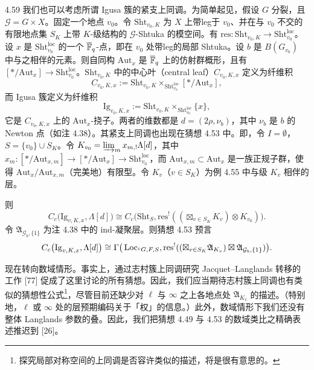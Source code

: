 \begin{exam}{4.59}\label{thm:a2-4-59}
我们也可以考虑所谓 Igusa 簇的紧支上同调。为简单起见，假设 $G$ 分裂，且 $\mathcal G=G\times X$。固定一个地点 $v_0$。令 $\mathrm{Sht}_{v_0,K}$ 为 $X$ 上带leg于 $v_0$、并在与 $v_0$ 不交的有限地点集 $S_K$ 上带 $K$-级结构的 $\mathcal G$-Shtuka 的模空间。有 $\mathrm{res}:\mathrm{Sht}_{v_0,K}\to\mathrm{Sht}^{\mathrm{loc}}_{v_0}$。设 $x$ 是 $\mathrm{Sht}^{\mathrm{loc}}_{v_0}$ 的一个 $\overline{\mathbb{F}}_q$-点，即在 $v_0$ 处带leg的局部 Shtuka。设 $b$ 是 $B(G_{v_0})$ 中与之相伴的元素。则自同构 $\mathrm{Aut}_x$ 是 $\overline{\mathbb{F}}_q$ 上的仿射群概形，且有 $[*/\mathrm{Aut}_x]\to\mathrm{Sht}^{\mathrm{loc}}_{v_0}$。$\mathrm{Sht}_{v_0,K}$ 中的中心叶（central leaf）$C_{v_0,K,x}$ 定义为纤维积
\[
C_{v_0,K,x}:=\mathrm{Sht}_{v_0,K}\times_{\mathrm{Sht}^{\mathrm{loc}}_{v_0}}[*/\mathrm{Aut}_x],
\]
而 Igusa 簇定义为纤维积
\[
\mathrm{Ig}_{v_0,K,x}:=\mathrm{Sht}_{v_0,K}\times_{\mathrm{Sht}^{\mathrm{loc}}_{v_0}}\{x\},
\]
它是 $C_{v_0,K,x}$ 上的 $\mathrm{Aut}_x$-挠子。两者的维数都是 $d=(2\rho,\nu_b)$，其中 $\nu_b$ 是 $b$ 的 Newton 点（如注 4.38）。其紧支上同调也出现在猜想 4.53 中。即，令 $I=\emptyset$，$S=\{v_0\}\cup S_K$。令 $K_{v_0}=\varinjlim_m x_{m,!}\Lambda[d]$，其中 $x_m:[*/\mathrm{Aut}_{x,m}]\to[*/\mathrm{Aut}_x]\to\mathrm{Sht}^{\mathrm{loc}}_{v_0}$，而 $\mathrm{Aut}_{x,m}\subset\mathrm{Aut}_x$ 是一族正规子群，使得 $\mathrm{Aut}_x/\mathrm{Aut}_{x,m}$（完美地）有限型。令 $K_v$（$v\in S_K$）为例 4.55 中与级 $K_v$ 相伴的层。
\end{exam}

则
\[
C_c\big(\mathrm{Ig}_{v,K,x},\Lambda[d]\big)\cong C_c\big(\mathrm{Sht}_S,\mathrm{res}^!((\boxtimes_{v\in S_K}K_v)\otimes K_{v_0})\big).
\]
令 $\mathfrak A_{\mathcal G_b,\{1\}}$ 为注 4.38 中的 ind-凝聚层。则猜想 4.53 预言
\[
C_c\big(\mathrm{Ig}_{v,K,x},\Lambda[d]\big)\cong\Gamma\big(\operatorname{Loc}_{{}^cG,F,S},\mathrm{res}^!((\boxtimes_{v\in S_K}\mathfrak A_{K_v})\boxtimes\mathfrak A_{\mathcal G_b,\{1\}})\big).
\]

现在转向数域情形。事实上，通过志村簇上同调研究 Jacquet–Langlands 转移的工作 [77] 促成了这里讨论的所有猜想。因此，我们应当期待志村簇上同调也有类似的猜想性公式\footnote{探究局部对称空间的上同调是否容许类似的描述，将是很有意思的。}，尽管目前还缺少对 $\ell$ 与 $\infty$ 之上各地点处 $\mathfrak A_{K_v}$ 的描述。（特别地，$\ell$ 或 $\infty$ 处的层预期编码关于「权」的信息。）此外，数域情形下我们还没有整体 Langlands 参数的叠。因此，我们把猜想 4.49 与 4.53 的数域类比之精确表述推迟到 [26]。

